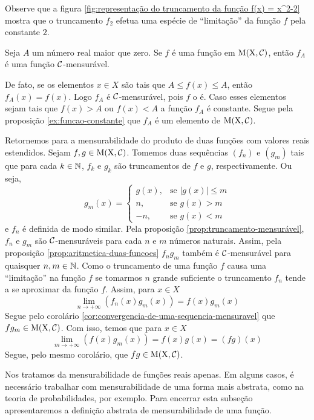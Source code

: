 	Observe que a figura \ref{fig:representação do truncamento da função f(x) = x^2-2} mostra que o truncamento $f_2$ efetua uma espécie de \enquote{limitação} da função $f$ pela constante $2$.

\begin{proposition}
	\label{prop:truncamento-mensurável}
	Seja $A$ um número real maior que zero.
	Se $f$ é uma função em $\operatorname{M(X, \mathcal{C} )}$, então $f_A$ é uma função $\operatorname{\mathcal{C}}$-mensurável.
\end{proposition}
\begin{prova}
	De fato, se os elementos $x \in X$ são tais que $A \leq f(x) \leq A$, então $f_A(x) = f(x)$.
	Logo $f_A$ é $\operatorname{\mathcal{C}}$-mensurável, pois $f$ o é.
	Caso esses elementos sejam tais que $f(x) > A$ ou $f(x) <A$ a função $f_A$ é constante.
	Segue pela proposição \ref{ex:funcao-constante} que $f_A$ é um elemento de $\operatorname{M(X, \mathcal{C} )}$.
\end{prova}

Retornemos para a mensurabilidade do produto de duas funções com valores reais estendidos.
Sejam $f,g \in \operatorname{M(X, \mathcal{C} )}$. 
Tomemos duas sequências $(f_n)$ e $(g_m)$ tais que para cada $k \in \operatorname{\mathbb{N}}$, $f_k$ e $g_k$ são truncamentos de $f$ e $g$, respectivamente.
Ou seja, 
	$$ g_m(x) =
		\left\{\begin{array}{cc}
			g(x), & \textrm{se\ } |g(x)| \leq m \\
			n, & \textrm{se\ } g(x) > m \\
			-n, & \textrm{se\ } g(x) < m 
		\end{array}\right.	
	$$
e $f_n$ é definida de modo similar.
Pela proposição \ref{prop:truncamento-mensurável}, $f_n$ e $g_m$ são $\operatorname{\mathcal{C}}$-mensuráveis para cada $n$ e $m$ números naturais.
Assim, pela proposição \ref{prop:aritmetica-duas-funcoes} $f_ng_m$ também é $\operatorname{\mathcal{C}}$-mensurável para quaisquer $n, m \in \operatorname{\mathbb{N}}$.
Como o truncamento de uma função $f$ causa uma \enquote{limitação} na função $f$ se tomarmos $n$ grande suficiente o truncamento $f_n$ tende a se aproximar da função $f$.
Assim, para $x \in X$
$$
\lim_{n \to +\infty} \left(f_n(x)g_m(x)\right) = f(x)g_m(x) 
$$
Segue pelo corolário \ref{cor:convergencia-de-uma-sequencia-mensuravel} que 
$fg_m \in \operatorname{M(X, \mathcal{C} )}$. Com isso, temos que para $x \in X$
$$
\lim_{m \to +\infty} \left(f(x)g_m(x)\right) 
= f(x)g(x) = (fg)(x)
$$
Segue, pelo mesmo corolário, que $fg \in \operatorname{M(X, \mathcal{C} )}$.

Nos tratamos da mensurabilidade de funções reais apenas.
Em alguns casos, é necessário trabalhar com mensurabilidade de uma forma mais abstrata, como na teoria de probabilidades, por exemplo.
Para encerrar esta subseção apresentaremos a definição abstrata de mensurabilidade de uma função.

